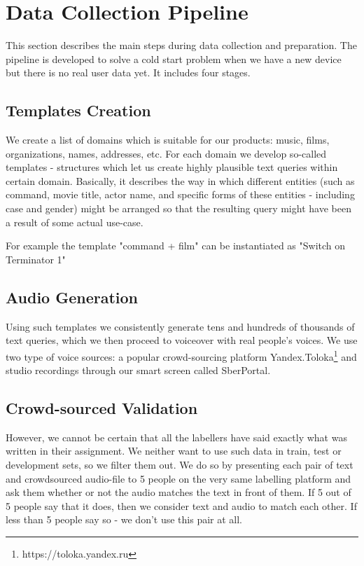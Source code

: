 \documentclass[a4paper]{article}
\begin{document}
\section{Data Collection Pipeline}

This section describes the main steps during data collection and preparation. The pipeline is developed to solve a cold start problem when we have a new device but there is no real user data yet. It includes four stages.

\subsection{Templates Creation}
We create a list of domains which is suitable for our products: music, films, organizations, names, addresses, etc.
For each domain we develop so-called templates - structures which let us create highly plausible text queries within certain domain. Basically, it describes the way in which different entities (such as command, movie title, actor name, and specific forms of these entities - including case and gender) might be arranged so that the resulting query might have been a result of some actual use-case. 

For example the template "command + film" can be instantiated as "Switch on Terminator 1"


\subsection{Audio Generation}
Using such templates we consistently generate tens and hundreds of thousands of text queries, which we then proceed to voiceover with real people's voices. We use two type of voice sources: a popular crowd-sourcing platform Yandex.Toloka\footnote{https://toloka.yandex.ru} and studio recordings through our smart screen called SberPortal.

\subsection{Crowd-sourced Validation}
However, we cannot be certain that all the labellers have said exactly what was written in their assignment. We neither want to use such data in train, test or development sets, so we filter them out. We do so by presenting each pair of text and crowdsourced audio-file to 5 people on the very same labelling platform and ask them whether or not the audio matches the text in front of them. If 5 out of 5 people say that it does, then we consider text and audio to match each other. If less than 5 people say so - we don't use this pair at all.
\end{document}
